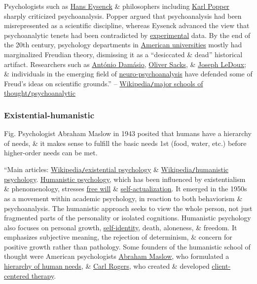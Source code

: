 \documentclass[oneside]{book}
\numberwithin{equation}{section}
\begin{document}
Psychologists such as \href{https://en.wikipedia.org/wiki/Hans_Eysenck}{Hans Eysenck} \& philosophers including \href{https://en.wikipedia.org/wiki/Karl_Popper}{Karl Popper} sharply criticized psychoanalysis. Popper argued that psychoanalysis had been misrepresented as a scientific discipline, whereas Eysenck advanced the view that psychoanalytic tenets had been contradicted by \href{https://en.wikipedia.org/wiki/Experiment}{experimental} data. By the end of the 20th century, psychology departments in \href{https://en.wikipedia.org/wiki/Higher_education_in_the_United_States}{American universities} mostly had marginalized Freudian theory, dismissing it as a ``desiccated \& dead'' historical artifact. Researchers such as \href{https://en.wikipedia.org/wiki/Ant%C3%B3nio_Dam%C3%A1sio}{Ant\'onio Dam\'asio}, \href{https://en.wikipedia.org/wiki/Oliver_Sacks}{Oliver Sacks}, \& \href{https://en.wikipedia.org/wiki/Joseph_LeDoux}{Joseph LeDoux}; \& individuals in the emerging field of \href{https://en.wikipedia.org/wiki/Neuro-psychoanalysis}{neuro-psychoanalysis} have defended some of Freud's ideas on scientific grounds.'' -- \href{https://en.wikipedia.org/wiki/Psychology#Psychoanalytic}{Wikipedia\texttt{/}major schools of thought\texttt{/}psychoanalytic}

\subsubsection{Existential-humanistic}
\textsf{Fig. Psychologist Abraham Maslow in 1943 posited that humans have a hierarchy of needs, \& it makes sense to fulfill the basic needs 1st (food, water, etc.) before higher-order needs can be met.}

``Main articles: \href{https://en.wikipedia.org/wiki/Existential_psychology}{Wikipedia\texttt{/}existential psychology} \& \href{https://en.wikipedia.org/wiki/Humanistic_psychology}{Wikipedia\texttt{/}humanistic psychology}. \href{https://en.wikipedia.org/wiki/Humanistic_psychology}{Humanistic psychology}, which has been influenced by existentialism \& phenomenology, stresses \href{https://en.wikipedia.org/wiki/Free_will}{free will} \& \href{https://en.wikipedia.org/wiki/Self-actualization}{self-actualization}. It emerged in the 1950s as a movement within academic psychology, in reaction to both behaviorism \& psychoanalysis. The humanistic approach seeks to view the whole person, not just fragmented parts of the personality or isolated cognitions. Humanistic psychology also focuses on personal growth, \href{https://en.wikipedia.org/wiki/Self-concept}{self-identity}, death, aloneness, \& freedom. It emphasizes subjective meaning, the rejection of determinism, \& concern for positive growth rather than pathology. Some founders of the humanistic school of thought were American psychologists \href{https://en.wikipedia.org/wiki/Abraham_Maslow}{Abraham Maslow}, who formulated a \href{https://en.wikipedia.org/wiki/Maslow%27s_hierarchy_of_needs}{hierarchy of human needs}, \& \href{https://en.wikipedia.org/wiki/Carl_Rogers}{Carl Rogers}, who created \& developed \href{https://en.wikipedia.org/wiki/Client-centered_therapy}{client-centered therapy}.
\end{document}
